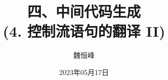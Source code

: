 \documentclass[]{beamer}
\title[中间代码生成]{四、中间代码生成 \\ (4. 控制流语句的翻译 II)}
\author[魏恒峰]{\large 魏恒峰}
\institute{hfwei@nju.edu.cn}
\date{2023年05月17日}
\begin{document}
\maketitle





\thankyou{}

\end{document}
